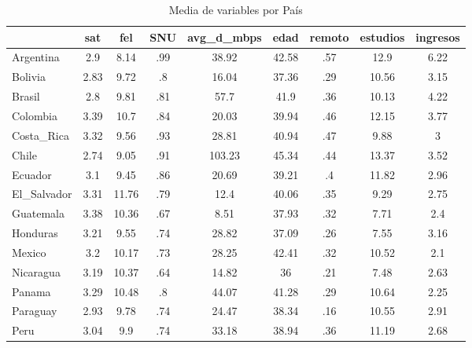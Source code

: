 \begin{table}[htbp]\centering
\caption{Media de variables por País}
\begin{tabular}{l*{8}{c}}
\hline\hline
            &         sat&         fel&         SNU&  avg\_d\_mbps&        edad&      remoto&    estudios&    ingresos\\
\hline
Argentina   &         2.9&        8.14&         .99&       38.92&       42.58&         .57&        12.9&        6.22\\
Bolivia     &        2.83&        9.72&          .8&       16.04&       37.36&         .29&       10.56&        3.15\\
Brasil      &         2.8&        9.81&         .81&        57.7&        41.9&         .36&       10.13&        4.22\\
Colombia    &        3.39&        10.7&         .84&       20.03&       39.94&         .46&       12.15&        3.77\\
Costa\_Rica  &        3.32&        9.56&         .93&       28.81&       40.94&         .47&        9.88&           3\\
Chile       &        2.74&        9.05&         .91&      103.23&       45.34&         .44&       13.37&        3.52\\
Ecuador     &         3.1&        9.45&         .86&       20.69&       39.21&          .4&       11.82&        2.96\\
El\_Salvador &        3.31&       11.76&         .79&        12.4&       40.06&         .35&        9.29&        2.75\\
Guatemala   &        3.38&       10.36&         .67&        8.51&       37.93&         .32&        7.71&         2.4\\
Honduras    &        3.21&        9.55&         .74&       28.82&       37.09&         .26&        7.55&        3.16\\
Mexico      &         3.2&       10.17&         .73&       28.25&       42.41&         .32&       10.52&         2.1\\
Nicaragua   &        3.19&       10.37&         .64&       14.82&          36&         .21&        7.48&        2.63\\
Panama      &        3.29&       10.48&          .8&       44.07&       41.28&         .29&       10.64&        2.25\\
Paraguay    &        2.93&        9.78&         .74&       24.47&       38.34&         .16&       10.55&        2.91\\
Peru        &        3.04&         9.9&         .74&       33.18&       38.94&         .36&       11.19&        2.68\\

\end{tabular}
\end{table}
